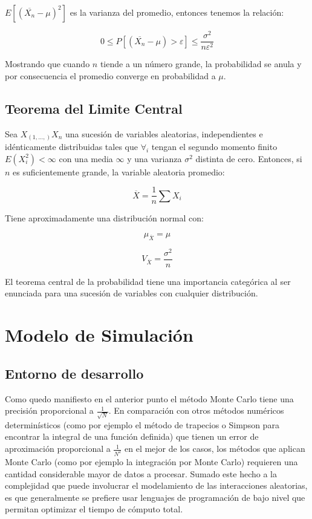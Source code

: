 \documentclass{rbf}
\begin{document}
$E[(\overline{X_n}-\mu)^2]$ es la varianza del promedio, entonces tenemos la relación:

\begin{equation}
  \displaystyle   0\leq P[(\overline{X_n}-\mu)>\varepsilon] \leq \frac{\sigma^2}{n\varepsilon^2}
\end{equation}

Mostrando que cuando $n$ tiende a un número grande, la probabilidad se anula y por consecuencia el promedio converge en probabilidad a $\mu$.

\subsection{Teorema del Limite Central}
Sea $X_(1,...,) X_n$ una sucesión de variables aleatorias, independientes e idénticamente distribuidas tales que $\forall_i$  tengan el segundo momento finito  $E(X_i^2)<\infty$ con una media $\infty$ y una varianza $\sigma^2$ distinta de cero. Entonces, si $n$ es suficientemente grande, la variable aleatoria promedio:

\begin{equation}
  \displaystyle   \overline{X}=\frac{1}{n}\sum X_i
\end{equation}

Tiene aproximadamente una distribución normal con:

\begin{equation}
 \displaystyle    \mu_{\overline{X}} =\mu
\end{equation}

\begin{equation}
  \displaystyle   V_{\overline{X}} =\frac{\sigma^2}{n}
\end{equation}

El teorema central de la probabilidad tiene una importancia categórica al ser enunciada para una sucesión de variables con cualquier distribución. 

\section{Modelo de Simulación}
\subsection{Entorno de desarrollo}

Como quedo manifiesto en el anterior punto el método Monte Carlo tiene una precisión proporcional a $\frac{1}{\sqrt{N}}$. En comparación con otros métodos numéricos determinísticos (como por ejemplo el método de trapecios o Simpson para encontrar la integral de una función definida) que tienen un error de aproximación proporcional a $\frac{1}{N^2}$ en el mejor de los casos, los métodos que aplican Monte Carlo (como por ejemplo la integración por Monte Carlo) requieren una cantidad considerable mayor de datos a procesar. Sumado este hecho a la complejidad que puede involucrar el modelamiento de las interacciones aleatorias, es que generalmente se prefiere usar lenguajes de programación de bajo nivel que permitan optimizar el tiempo de cómputo total.
\end{document}
